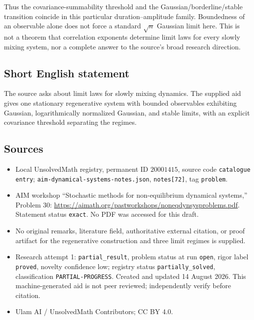 \documentclass[11pt]{article}
\begin{document}
Thus the covariance-summability threshold and the Gaussian/borderline/stable transition coincide in this particular duration--amplitude family. Boundedness of an observable alone does not force a standard \(\sqrt n\) Gaussian limit here. This is not a theorem that correlation exponents determine limit laws for every slowly mixing system, nor a complete answer to the source's broad research direction.
\subsection{Short English statement}
The source asks about limit laws for slowly mixing dynamics. The supplied aid gives one stationary regenerative system with bounded observables exhibiting Gaussian, logarithmically normalized Gaussian, and stable limits, with an explicit covariance threshold separating the regimes.
\subsection{Sources}
\begin{itemize}
\item Local UnsolvedMath registry, permanent ID \(20001415\), source code \texttt{catalogue entry}; \texttt{aim-dynamical-systems-notes.json}, \texttt{notes[72]}, tag \texttt{problem}.
\item AIM workshop ``Stochastic methods for non-equilibrium dynamical systems,'' Problem 30: \url{https://aimath.org/pastworkshops/noneqdynsysproblems.pdf}. Statement status \texttt{exact}. No PDF was accessed for this draft.
\item No original remarks, literature field, authoritative external citation, or proof artifact for the regenerative construction and three limit regimes is supplied.
\item Research attempt 1: \texttt{partial\_result}, problem status at run \texttt{open}, rigor label \texttt{proved}, novelty confidence low; registry status \texttt{partially\_solved}, classification \texttt{PARTIAL-PROGRESS}. Created and updated 14 August 2026. This machine-generated aid is not peer reviewed; independently verify before citation.
\item Ulam AI / UnsolvedMath Contributors; CC BY 4.0.
\end{itemize}
\end{document}
